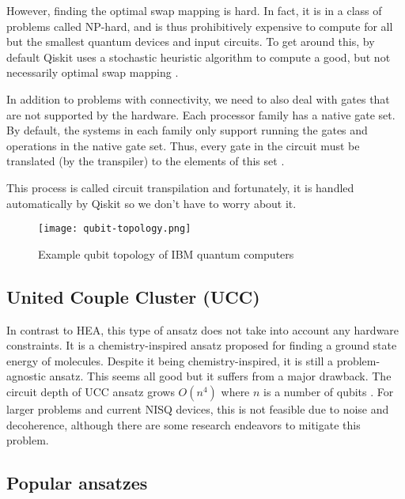 However, finding the optimal swap mapping is hard. In fact, it is in a class of problems called NP-hard, and is thus prohibitively expensive to compute for all but the smallest quantum devices and input circuits. To get around this, by default Qiskit uses a stochastic heuristic algorithm to compute a good, but not necessarily optimal swap mapping \cite{transpiler}. 

In addition to problems with connectivity, we need to also deal with gates that are not supported by the hardware. Each processor family has a native gate set. By default, the systems in each family only support running the gates and operations in the native gate set. Thus, every gate in the circuit must be translated (by the transpiler) to the elements of this set \cite{native_gates}.

This process is called circuit transpilation and fortunately, it is handled automatically by Qiskit so we don't have to worry about it. 
\begin{figure}[H]
    \texttt{[image: qubit-topology.png]}
    \caption{Example qubit topology of IBM quantum computers}
\end{figure}



\subsection{United Couple Cluster (UCC)}
In contrast to HEA, this type of ansatz does not take into account any hardware constraints. It is a chemistry-inspired ansatz proposed for finding a ground state energy of molecules. Despite it being chemistry-inspired, it is still a problem-agnostic ansatz. This seems all good but it suffers from a major drawback. The circuit depth of UCC ansatz grows $O(n^4)$ where $n$ is a number of qubits \cite{ucc_ansatz}. For larger problems and current NISQ devices, this is not feasible due to noise and decoherence, although there are some research endeavors to mitigate this problem.
  
\subsection{Popular ansatzes}

